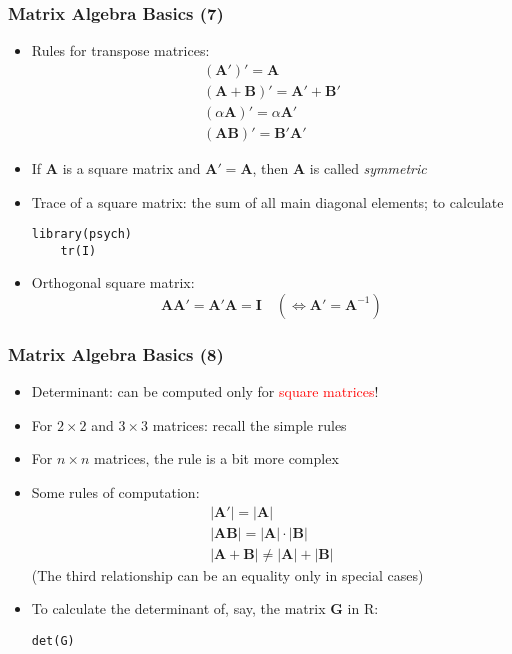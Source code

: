 \documentclass[10pt]{beamer}
\theoremstyle{definition}
\begin{document}
\begin{frame}[fragile]
\frametitle{Matrix Algebra Basics (7)}
\begin{itemize}
	\item Rules for transpose matrices:
	\[
		\begin{array}{lcl}
			(\mathbf{A}')' = \mathbf{A}\\
			(\mathbf{A + B})' = \mathbf{A}' + \mathbf{B}'\\
			(\alpha \mathbf{A})' = \alpha \mathbf{A}'\\
			(\mathbf{AB})' = \mathbf{B}'\mathbf{A}'
		\end{array}
	\]
	\item If $\mathbf{A}$ is a square matrix and $\mathbf{A}' = \mathbf{A}$, then $\mathbf{A}$ is called \textit{symmetric}
	
	\item Trace of a square matrix: the sum of all main diagonal elements; to calculate
	\begin{lstlisting}[style = rstyle, breaklines]
	library(psych)
	tr(I)
	\end{lstlisting}

	\item Orthogonal square matrix: 
	\[
		\mathbf{AA' = A'A = I} \quad (\Leftrightarrow \mathbf{A' = A}^{-1})
	\]
\end{itemize}
\end{frame}

\begin{frame}[fragile]
\frametitle{Matrix Algebra Basics (8)}
\begin{itemize}
	\item Determinant: can be computed only for \textcolor{red}{square matrices}!
	\item For $2\times 2$ and $3 \times 3$ matrices: recall the simple rules
	\item For $n\times n$ matrices, the rule is a bit more complex
	\item Some rules of computation:
	\[
		\begin{array}{lcl}
			|\mathbf{A}'| = |\mathbf{A}|\\
			|\mathbf{AB}| = |\mathbf{A}|\cdot |\mathbf{B}|\\
			|\mathbf{A + B}| \neq |\mathbf{A}| + |\mathbf{B}|
		\end{array}
	\]
	(The third relationship can be an equality only in special cases)
	\item To calculate the determinant of, say, the matrix $\mathbf{G}$ in R:
	\begin{lstlisting}[style = rstyle, breaklines]
	det(G)	
	\end{lstlisting}
\end{itemize}
\end{frame}
\end{document}
